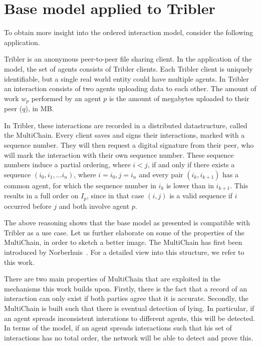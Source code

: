 \documentclass[a4paper,11pt]{book}
\theoremstyle{definition}
\begin{document}
\section{Base model applied to Tribler}

To obtain more insight into the ordered interaction model, consider the following application.

Tribler is an anonymous peer-to-peer file sharing client. In the application of the model,
the set of agents consists of Tribler clients. Each Tribler client is uniquely identifiable,
but a single real world entity could have multiple agents. In Tribler an interaction
consists of two agents uploading data to each other. The amount of work $w_p$ performed
by an agent $p$ is the amount of megabytes uploaded to their peer ($q$), in MB.

In Tribler, these interactions are recorded in a distributed datastructure, called the MultiChain.
Every client saves and signs their interactions, marked with a sequence number. They will then request
a digital signature from their peer, who will mark the interaction with their own sequence number.
These sequence numbers induce a partial ordering, where $i < j$, if and only if there exists
a sequence $(i_0, i_1, \ldots i_n)$, where $i=i_0, j=i_n$ and every pair $(i_k, i_{k+1})$ has
a common agent, for which the sequence number in $i_k$ is lower than in $i_{k+1}$.
This results in a full order on $I_p$, since in that case $(i, j)$ is a valid sequence if
$i$ occurred before $j$ and both involve agent $p$.

The above reasoning shows that the base model as presented is compatible with Tribler as a use case.
Let us further elaborate on some of the properties of the MultiChain, in order to sketch a better image.
The MultiChain has first been introduced by Norberhuis~\cite{norberhuis2015multichain}. For a detailed
view into this structure, we refer to this work.

There are two main properties of MultiChain that are exploited in the mechanisms this work builds upon.
Firstly, there is the fact that a record of an interaction can only exist if both parties agree that it
is accurate. Secondly, the MultiChain is built such that there is eventual detection of lying. In particular,
if an agent spreads inconsistent interations to different agents, this will be detected. In terms of the model,
if an agent spreads interactions such that his set of interactions has no total order, the network will
be able to detect and prove this. 
\end{document}
